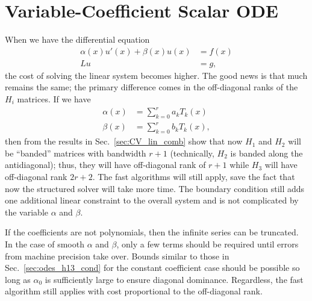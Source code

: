 \section{Variable-Coefficient Scalar ODE}
\label{sec:odes_scalar_var}

When we have the differential equation
%
\begin{align}
    \alpha(x)u'(x) + \beta(x)u(x) &= f(x) \nonumber\\
    Lu &= g,
\end{align}
%
the cost of solving the linear system becomes higher.
The good news is that much remains the same; the primary difference
comes in the off-diagonal ranks of the $H_{i}$ matrices.
If we have
%
\begin{align}
    \alpha(x) &= \sum_{k=0}^{r} a_{k}T_{k}(x) \nonumber\\
    \beta(x)  &= \sum_{k=0}^{r} b_{k}T_{k}(x),
\end{align}
%
then from the results in Sec.~\ref{sec:CV_lin_comb} show that
now $H_{1}$ and $H_{2}$ will be ``banded'' matrices with bandwidth $r+1$
(technically, $H_{2}$ is banded along the antidiagonal);
thus, they will have off-diagonal rank of $r+1$ while
$H_{3}$ will have off-diagonal rank $2r+2$.
The fast algorithms will still apply, save the fact that now
the structured solver will take more time.
The boundary condition still adds one additional linear constraint
to the overall system and is not complicated by the variable $\alpha$
and $\beta$.

If the coefficients are not polynomials, then the infinite series
can be truncated.
In the case of smooth $\alpha$ and $\beta$, only a few terms should
be required until errors from machine precision take over.
Bounds similar to those in Sec.~\ref{sec:odes_h13_cond} for the
constant coefficient case should be possible so long as $\alpha_{0}$
is sufficiently large to ensure diagonal dominance.
Regardless, the fast algorithm still applies with cost proportional
to the off-diagonal rank.

